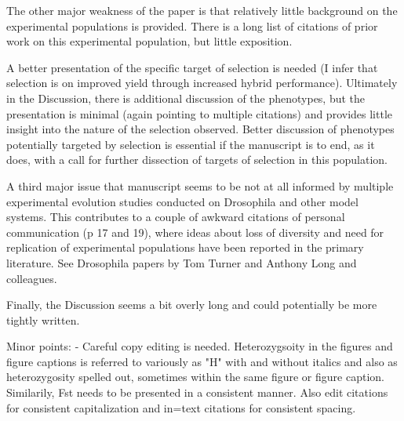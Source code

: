 \documentclass[onecolumn,oneside,letterpaper]{article}
\begin{document}
The other major weakness of the paper is that relatively little background on the experimental populations 
is provided. There is a long list of citations of prior work on this experimental population, but little 
exposition.


A better presentation of the specific target of selection is needed (I infer that selection is on 
improved yield through increased hybrid performance). Ultimately in the Discussion, there is additional 
discussion of the phenotypes, but the presentation is minimal (again pointing to multiple citations) and 
provides little insight into the nature of the selection observed. Better discussion of phenotypes potentially 
targeted by selection is essential if the manuscript is to end, as it does, with a call for further dissection of 
targets of selection in this population.


A third major issue that manuscript seems to be not at all informed by multiple experimental evolution 
studies conducted on Drosophila and other model systems. This contributes to a couple of awkward 
citations of personal communication (p 17 and 19), where ideas about loss of diversity and need for 
replication of experimental populations have been reported in the primary literature. See Drosophila papers 
by Tom Turner and Anthony Long and colleagues.


Finally, the Discussion seems a bit overly long and could potentially be more tightly written.


Minor points: 
- Careful copy editing is needed. Heterozygsoity in the figures and figure captions is referred to variously 
as "H" with and without italics and also as heterozygosity spelled out, sometimes within the same figure or 
figure caption. Similarily, Fst needs to be presented in a consistent manner. 
Also edit citations for consistent capitalization and in=text citations for consistent spacing. 
\end{document}
